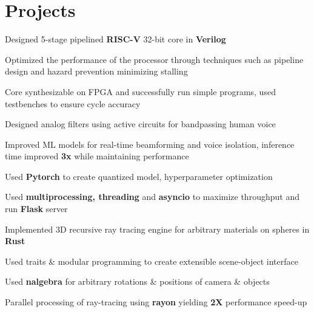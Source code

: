 \documentclass[]{chandan-cv}
\begin{document}
\begin{minipage}[t]{0.77\textwidth}

\section{Projects}

\descript{ }
\location{ }
\begin{tightemize}
	\item Designed 5-stage pipelined \textbf{RISC-V} 32-bit core in \textbf{Verilog}
	\item Optimized the performance of the processor through techniques such as pipeline design and hazard prevention minimizing stalling
	\item Core synthesizable on FPGA and successfully run simple programs, used testbenches to ensure cycle accuracy
\end{tightemize}
\sectionsep


\descript{ }
\location{ }
\begin{tightemize}
	\item Designed analog filters using active circuits for bandpassing human voice
	\item Improved ML models for real-time beamforming and voice isolation, inference time improved \textbf{3x} while maintaining performance
	\item Used \textbf{Pytorch} to create quantized model, hyperparameter optimization
	\item Used \textbf{multiprocessing, threading} and \textbf{asyncio} to maximize throughput and run \textbf{Flask} server
\end{tightemize}
\sectionsep


\descript{ }
\location{ }
\begin{tightemize}
	\item Implemented 3D recursive ray tracing engine for arbitrary materials on spheres in \textbf{Rust}
	\item Used traits \& modular programming to create extensible scene-object interface
	\item Used \textbf{nalgebra} for arbitrary rotations \& positions of camera \& objects
	\item Parallel processing of ray-tracing using \textbf{rayon} yielding \textbf{2X} performance speed-up
\end{tightemize}
\sectionsep


\end{minipage}
\end{document}
